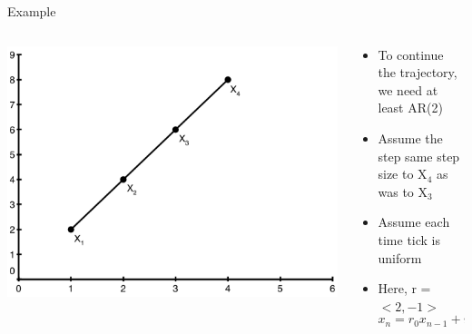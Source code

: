 \documentclass[aspectratio=169]{beamer}
\begin{document}
\begin{frame}{Example}

\begin{columns}
\begin{column}{0.4\textwidth}
\includegraphics[width=1\textwidth]{lectSeq/ARLR.pdf}
\end{column}
\begin{column}{0.6\textwidth}
\begin{itemize}
\item To continue the trajectory, we need at least AR(2)
\item Assume the step same step size to X$_4$ as was to X$_3$
\item Assume each time tick is uniform
\item Here, r = $<2, -1>$
$$x_n = r_0 x_{n-1} + r_1 x_{n-2}$$
\end{itemize}
\end{column}
\end{columns}
\end{frame}
\end{document}
